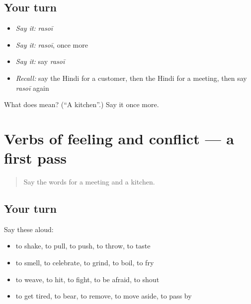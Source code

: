 \subsection*{Your turn}
\begin{itemize}
\raggedright
  \item \emph{Say it:} \emph{rasoī}
  \item \emph{Say it:} \emph{rasoī}, once more
  \item \emph{Say it:} say \emph{rasoī}
  \item \emph{Recall:} say the Hindi for a customer, then the Hindi for a meeting, then say \emph{rasoī} again
\end{itemize}

\begin{tcolorbox}[breakable,colback=teal!4,colframe=teal!35!black,title={Before you move on}]
What does  mean? (\textquotedblleft{}A kitchen\textquotedblright{}.) Say it once more.
\end{tcolorbox}
\section[(dialogue)]{Verbs of feeling and conflict — a first pass}

\label{lesson:HI-R183-first-pass-verbs-of-feeling-and-conflict}



\begin{quote}
Say the words for a meeting and a kitchen.
\end{quote}

\subsection*{Your turn}
Say these aloud:

\begin{itemize}
\raggedright
  \item to shake, to pull, to push, to throw, to taste
  \item to smell, to celebrate, to grind, to boil, to fry
  \item to weave, to hit, to fight, to be afraid, to shout
  \item to get tired, to bear, to remove, to move aside, to pass by
\end{itemize}


